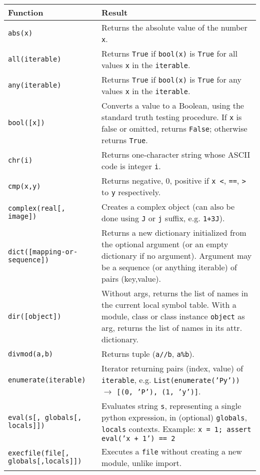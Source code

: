 {\footnotesize
\begin{longtable}{|l|p{9cm}|}
\hline
\bf Function & \bf Result \\
\hline
\hline
\tt abs(x)		& Returns the absolute value of the number {\tt x}.\\
\hline
\tt all(iterable) 	& Returns {\tt True} if {\tt bool(x)} is {\tt True} for all values {\tt x} in the {\tt iterable}.\\
\hline
\tt any(iterable) 	& Returns {\tt True} if {\tt bool(x)} is {\tt True} for any values {\tt x} in the {\tt iterable}.\\
\hline
\tt bool([x]) 		& Converts a value to a Boolean, using the standard truth testing procedure. If {\tt x} is false or omitted, 
			  returns {\tt False}; otherwise returns {\tt True}.\\ 
\hline
\tt chr(i) 		& Returns one-character string whose ASCII code is integer {\tt i}.\\
\hline
\tt cmp(x,y) 		& Returns negative, 0, positive if {\tt x <}, {\tt ==}, {\tt >} to {\tt y} respectively.\\
\hline
\tt complex(real[, image]) 	& Creates a complex object (can also be done using {\tt J} or {\tt j} suffix, e.g. {\tt 1+3J}).\\
\hline
\tt dict([mapping-or-sequence]) & Returns a new dictionary initialized from the optional argument (or an empty dictionary if no argument). 
				  Argument may be a sequence (or anything iterable) of pairs (key,value).\\
\hline
\tt dir([object]) 		& Without args, returns the list of names in the current local symbol table. 
			  	  With a module, class or class instance {\tt object} as arg, returns the list of names in its attr. dictionary.\\
\hline
\tt divmod(a,b) 	& Returns tuple ({\tt a//b}, {\tt a\%b}).\\
\hline
\tt enumerate(iterable) & Iterator returning pairs (index, value) of {\tt iterable}, e.g. {\tt List(enumerate('Py'))} 
			  $\rightarrow$ {\tt [(0, 'P'), (1, 'y')]}.\\
\hline
\tt eval(s[, globals[, locals]])& Evaluates string {\tt s}, representing a single python expression, in (optional) {\tt globals}, 
				  {\tt locals} contexts.\newline
				  Example: {\tt x = 1; assert eval('x + 1') == 2}\\
\hline
\tt execfile(file[, globals[,locals]])	& Executes a {\tt file} without creating a new module, unlike import.\\

\end{longtable}}
